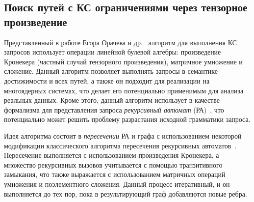 \subsection{Поиск путей с КС ограничениями через тензорное произведение}

Представленный в работе Егора Орачева и др.~\cite{inbook:kronecker_cfpq_adbis} алгоритм для выполнения КС запросов использует операции линейной булевой алгебры: произведение Кронекера (частный случай тензорного произведения), матричное умножение и сложение. Данный алгоритм позволяет выполнять запросы в семантике достижимости и всех путей, а также он подходит для реализации на многоядерных системах, что делает его потенциально применимым для анализа реальных данных. Кроме этого, данный алгоритм использует в качестве формализма для представления запроса \textit{рекурсивный автомат} (РА)~\cite{article:recursive_state_machines}, что потенциально может решить проблему разрастания исходной грамматики запроса. 

Идея алгоритма состоит в \textit{пересечении} РА и графа с использованием некоторой модификации классического алгоритма пересечения рекурсивных автоматов~\cite{book:automata_theory}. Пересечение выполняется с использованием произведения Кронекера, а множество рекурсивных вызовов учитывается с помощью транзитивного замыкания, что также выражается с использованием матричных операций умножения и поэлементного сложения. Данный процесс итеративный, и он выполняется до тех пор, пока в результирующий граф добавляются новые ребра.






